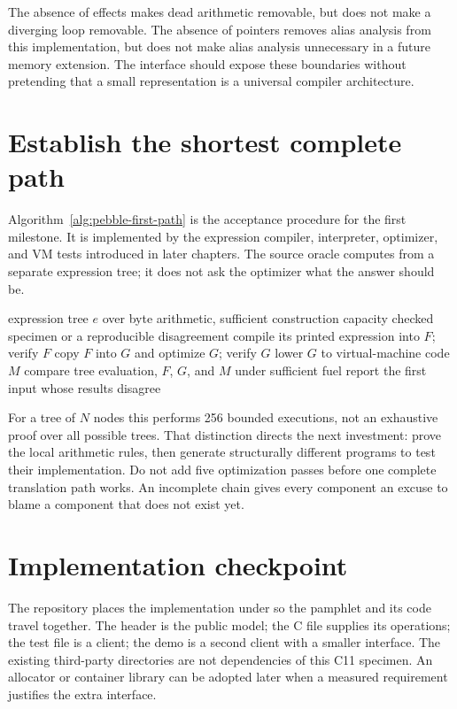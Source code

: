 The absence of effects makes dead arithmetic removable, but does not make a diverging loop removable.
The absence of pointers removes alias analysis from this implementation, but does not make alias analysis unnecessary in a future memory extension.
The interface should expose these boundaries without pretending that a small representation is a universal compiler architecture.

\section{Establish the shortest complete path}
\label{sec:pebble-first-path}
Algorithm~\ref{alg:pebble-first-path} is the acceptance procedure for the first milestone.
It is implemented by the expression compiler, interpreter, optimizer, and VM tests introduced in later chapters.
The source oracle computes from a separate expression tree; it does not ask the optimizer what the answer should be.

\begin{algorithm}[htbp]
\caption{Accepting an end-to-end PebbleIR specimen.}
\label{alg:pebble-first-path}
\begin{pseudocode}
\Require expression tree $e$ over byte arithmetic, sufficient construction capacity
\Ensure checked specimen or a reproducible disagreement
\State compile its printed expression into $F$; verify $F$
\State copy $F$ into $G$ and optimize $G$; verify $G$
\State lower $G$ to virtual-machine code $M$
\State compare tree evaluation, $F$, $G$, and $M$ under sufficient fuel
\State report the first input whose results disagree
\EndFor
\end{pseudocode}
\end{algorithm}

For a tree of $N$ nodes this performs 256 bounded executions, not an exhaustive proof over all possible trees.
That distinction directs the next investment: prove the local arithmetic rules, then generate structurally different programs to test their implementation.
Do not add five optimization passes before one complete translation path works.
An incomplete chain gives every component an excuse to blame a component that does not exist yet.

\section{Implementation checkpoint}
\label{sec:pebble-checkpoint}
The repository places the implementation under  so the pamphlet and its code travel together.
The header is the public model; the C file supplies its operations; the test file is a client; the demo is a second client with a smaller interface.
The existing third-party directories are not dependencies of this C11 specimen.
An allocator or container library can be adopted later when a measured requirement justifies the extra interface.

